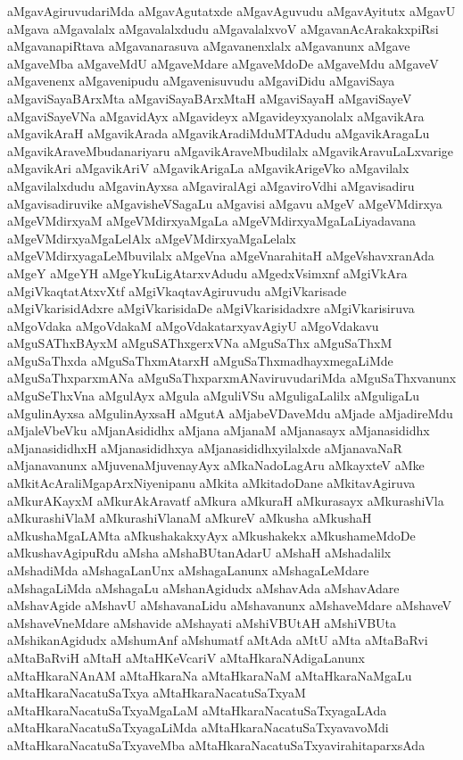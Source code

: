 {aMgavAgiruvudariMda
aMgavAgutatxde
aMgavAguvudu
aMgavAyitutx
aMgavU
aMgava
aMgavalalx
aMgavalalxdudu
aMgavalalxvoV
aMgavanAcArakakxpiRsi
aMgavanapiRtava
aMgavanarasuva
aMgavanenxlalx
aMgavanunx
aMgave
aMgaveMba
aMgaveMdU
aMgaveMdare
aMgaveMdoDe
aMgaveMdu
aMgaveV
aMgavenenx
aMgavenipudu
aMgavenisuvudu
aMgaviDidu
aMgaviSaya
aMgaviSayaBArxMta
aMgaviSayaBArxMtaH
aMgaviSayaH
aMgaviSayeV
aMgaviSayeVNa
aMgavidAyx
aMgavideyx
aMgavideyxyanolalx
aMgavikAra
aMgavikAraH
aMgavikArada
aMgavikAradiMduMTAdudu
aMgavikAragaLu
aMgavikAraveMbudanariyaru
aMgavikAraveMbudilalx
aMgavikAravuLaLxvarige
aMgavikAri
aMgavikAriV
aMgavikArigaLa
aMgavikArigeVko
aMgavilalx
aMgavilalxdudu
aMgavinAyxsa
aMgaviralAgi
aMgaviroVdhi
aMgavisadiru
aMgavisadiruvike
aMgavisheVSagaLu
aMgavisi
aMgavu
aMgeV
aMgeVMdirxya
aMgeVMdirxyaM
aMgeVMdirxyaMgaLa
aMgeVMdirxyaMgaLaLiyadavana
aMgeVMdirxyaMgaLelAlx
aMgeVMdirxyaMgaLelalx
aMgeVMdirxyagaLeMbuvilalx
aMgeVna
aMgeVnarahitaH
aMgeVshavxranAda
aMgeY
aMgeYH
aMgeYkuLigAtarxvAdudu
aMgedxVsimxnf
aMgiVkAra
aMgiVkaqtatAtxvXtf
aMgiVkaqtavAgiruvudu
aMgiVkarisade
aMgiVkarisidAdxre
aMgiVkarisidaDe
aMgiVkarisidadxre
aMgiVkarisiruva
aMgoVdaka
aMgoVdakaM
aMgoVdakatarxyavAgiyU
aMgoVdakavu
aMguSAThxBAyxM
aMguSAThxgerxVNa
aMguSaThx
aMguSaThxM
aMguSaThxda
aMguSaThxmAtarxH
aMguSaThxmadhayxmegaLiMde
aMguSaThxparxmANa
aMguSaThxparxmANaviruvudariMda
aMguSaThxvanunx
aMguSeThxVna
aMgulAyx
aMgula
aMguliVSu
aMguligaLalilx
aMguligaLu
aMgulinAyxsa
aMgulinAyxsaH
aMgutA
aMjabeVDaveMdu
aMjade
aMjadireMdu
aMjaleVbeVku
aMjanAsididhx
aMjana
aMjanaM
aMjanasayx
aMjanasididhx
aMjanasididhxH
aMjanasididhxya
aMjanasididhxyilalxde
aMjanavaNaR
aMjanavanunx
aMjuvenaMjuvenayAyx
aMkaNadoLagAru
aMkayxteV
aMke
aMkitAcAraliMgapArxNiyenipanu
aMkita
aMkitadoDane
aMkitavAgiruva
aMkurAKayxM
aMkurAkAravatf
aMkura
aMkuraH
aMkurasayx
aMkurashiVla
aMkurashiVlaM
aMkurashiVlanaM
aMkureV
aMkusha
aMkushaH
aMkushaMgaLAMta
aMkushakakxyAyx
aMkushakekx
aMkushameMdoDe
aMkushavAgipuRdu
aMsha
aMshaBUtanAdarU
aMshaH
aMshadalilx
aMshadiMda
aMshagaLanUnx
aMshagaLanunx
aMshagaLeMdare
aMshagaLiMda
aMshagaLu
aMshanAgidudx
aMshavAda
aMshavAdare
aMshavAgide
aMshavU
aMshavanaLidu
aMshavanunx
aMshaveMdare
aMshaveV
aMshaveVneMdare
aMshavide
aMshayati
aMshiVBUtAH
aMshiVBUta
aMshikanAgidudx
aMshumAnf
aMshumatf
aMtAda
aMtU
aMta
aMtaBaRvi
aMtaBaRviH
aMtaH
aMtaHKeVcariV
aMtaHkaraNAdigaLanunx
aMtaHkaraNAnAM
aMtaHkaraNa
aMtaHkaraNaM
aMtaHkaraNaMgaLu
aMtaHkaraNacatuSaTxya
aMtaHkaraNacatuSaTxyaM
aMtaHkaraNacatuSaTxyaMgaLaM
aMtaHkaraNacatuSaTxyagaLAda
aMtaHkaraNacatuSaTxyagaLiMda
aMtaHkaraNacatuSaTxyavavoMdi
aMtaHkaraNacatuSaTxyaveMba
aMtaHkaraNacatuSaTxyavirahitaparxsAda
}

